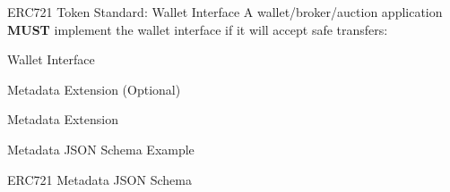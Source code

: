 \documentclass[]{beamer}
\begin{document}
\begin{frame}{ERC721 Token Standard: Wallet Interface}
A wallet/broker/auction application \textbf{MUST} implement the wallet interface if it will accept safe transfers:
\begin{samplecode}{Wallet Interface}
		
\end{samplecode}
\end{frame}

\begin{frame}{Metadata Extension (Optional)}
\begin{samplecode}{Metadata Extension}
		
\end{samplecode}

\vspace{0.5em}

\end{frame}

\begin{frame}{Metadata JSON Schema Example}
\begin{samplecode}{ERC721 Metadata JSON Schema}
		
\end{samplecode}
\end{frame}
\end{document}
